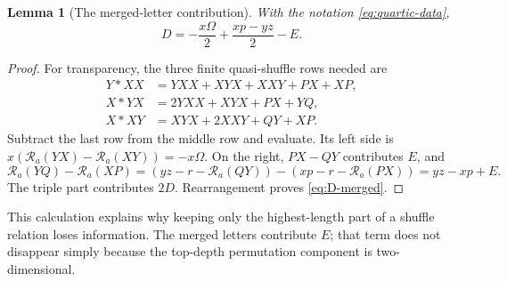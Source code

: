 \documentclass[11pt]{article}
\numberwithin{equation}{section}
\newtheorem{lemma}[theorem]{Lemma}
\theoremstyle{definition}
\newcommand{\R}{\mathcal R}
\begin{document}
\begin{lemma}[The merged-letter contribution]\label{lem:D-merged}
With the notation \eqref{eq:quartic-data},
\begin{equation}\label{eq:D-merged}
 D=-\frac{x\Omega}{2}+\frac{xp-yz}{2}-E.
\end{equation}
\end{lemma}
\begin{proof}
For transparency, the three finite quasi-shuffle rows needed are
\begin{align*}
 Y*XX&=YXX+XYX+XXY+PX+XP,\\
 X*YX&=2YXX+XYX+PX+YQ,\\
 X*XY&=XYX+2XXY+QY+XP.
\end{align*}
Subtract the last row from the middle row and evaluate. Its left side
is $x(\R_a(YX)-\R_a(XY))=-x\Omega$. On the right,
$PX-QY$ contributes $E$, and
\[
 \R_a(YQ)-\R_a(XP)
 =(yz-r-\R_a(QY))-(xp-r-\R_a(PX))=yz-xp+E.
\]
The triple part contributes $2D$. Rearrangement proves
\eqref{eq:D-merged}.
\end{proof}

This calculation explains why keeping only the highest-length part of a
shuffle relation loses information. The merged letters contribute $E$;
that term does not disappear simply because the top-depth permutation
component is two-dimensional.
\end{document}
